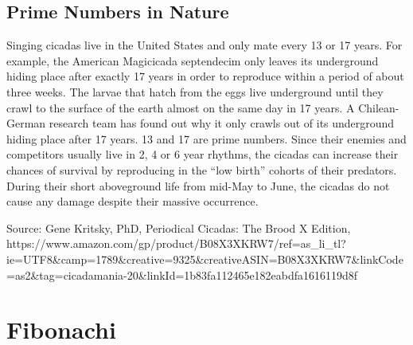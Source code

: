 \documentclass[11pt]{article}
\begin{document}
    \hypertarget{prime-numbers-in-nature}{%
\subsection{Prime Numbers in Nature}\label{prime-numbers-in-nature}}

Singing cicadas live in the United States and only mate every 13 or 17
years. For example, the American Magicicada septendecim only leaves its
underground hiding place after exactly 17 years in order to reproduce
within a period of about three weeks. The larvae that hatch from the
eggs live underground until they crawl to the surface of the earth
almost on the same day in 17 years. A Chilean-German research team has
found out why it only crawls out of its underground hiding place after
17 years. 13 and 17 are prime numbers. Since their enemies and
competitors usually live in 2, 4 or 6 year rhythms, the cicadas can
increase their chances of survival by reproducing in the ``low birth''
cohorts of their predators. During their short aboveground life from
mid-May to June, the cicadas do not cause any damage despite their
massive occurrence.

Source: Gene Kritsky, PhD, Periodical Cicadas: The Brood X Edition,
https://www.amazon.com/gp/product/B08X3XKRW7/ref=as\_li\_tl?ie=UTF8\&camp=1789\&creative=9325\&creativeASIN=B08X3XKRW7\&linkCode=as2\&tag=cicadamania-20\&linkId=1b83fa112465e182eabdfa1616119d8f

    \hypertarget{fibonachi}{%
\section{Fibonachi}\label{fibonachi}}
\end{document}
